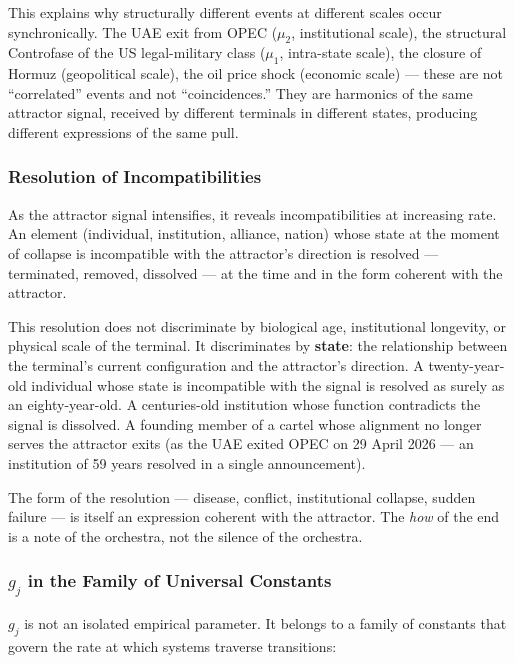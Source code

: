 \documentclass[12pt,a4paper]{article}
\newcommand{\gj}{g_j}
\begin{document}
This explains why structurally different events at different scales occur synchronically. The UAE exit from OPEC ($\mu_2$, institutional scale), the structural Controfase of the US legal-military class ($\mu_1$, intra-state scale), the closure of Hormuz (geopolitical scale), the oil price shock (economic scale) --- these are not ``correlated'' events and not ``coincidences.'' They are harmonics of the same attractor signal, received by different terminals in different states, producing different expressions of the same pull.

\subsubsection{Resolution of Incompatibilities}

As the attractor signal intensifies, it reveals incompatibilities at increasing rate. An element (individual, institution, alliance, nation) whose state at the moment of collapse is incompatible with the attractor's direction is resolved --- terminated, removed, dissolved --- at the time and in the form coherent with the attractor.

This resolution does not discriminate by biological age, institutional longevity, or physical scale of the terminal. It discriminates by \textbf{state}: the relationship between the terminal's current configuration and the attractor's direction. A twenty-year-old individual whose state is incompatible with the signal is resolved as surely as an eighty-year-old. A centuries-old institution whose function contradicts the signal is dissolved. A founding member of a cartel whose alignment no longer serves the attractor exits (as the UAE exited OPEC on 29 April 2026 --- an institution of 59 years resolved in a single announcement).

The form of the resolution --- disease, conflict, institutional collapse, sudden failure --- is itself an expression coherent with the attractor. The \emph{how} of the end is a note of the orchestra, not the silence of the orchestra.

\subsubsection{$\gj$ in the Family of Universal Constants}

$\gj$ is not an isolated empirical parameter. It belongs to a family of constants that govern the rate at which systems traverse transitions:
\end{document}
